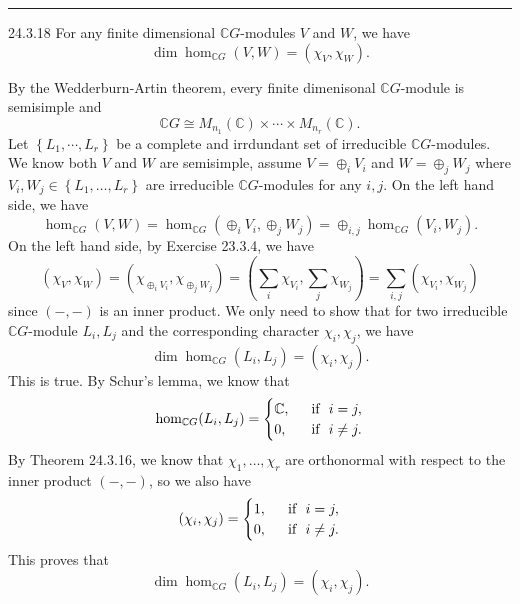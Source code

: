 \documentclass[a4paper, 12pt]{article}
\begin{document}
\noindent\rule{7in}{2.8pt}
\begin{problem}{24.3.18}
For any finite dimensional \(\mathbb{C}G\)-modules \(V\) and \(W\), we have 
\[\dim \hom_{\mathbb{C}G}(V,W)=(\chi_V,\chi_W).\]
\end{problem}
\begin{solution}
By the Wedderburn-Artin theorem, every finite dimenisonal \(\mathbb{C}G\)-module is semisimple and 
\[\mathbb{C}G\cong M_{n_1}(\mathbb{C})\times \cdots\times M_{n_r}(\mathbb{C}).\]
Let \(\left\{ L_1,\cdots,L_r \right\}\) be a complete and irrdundant set of irreducible \(\mathbb{C}G\)-modules. We know both \(V\) and \(W\) are semisimple, assume 
\(V=\oplus_i V_i\) and \(W=\oplus_j W_j\) where \(V_i,W_j\in \left\{ L_1,\ldots,L_r \right\}\) are irreducible \(\mathbb{C}G\)-modules for any \(i,j\). On the left hand side, we have 
\[\hom_{\mathbb{C}G}(V,W)=\hom_{\mathbb{C}G}(\oplus_i V_i,\oplus_j W_j)=\oplus_{i,j}\hom_{\mathbb{C}G}(V_i,W_j).\]
On the left hand side, by Exercise 23.3.4, we have 
\[(\chi_V,\chi_W)=(\chi_{\oplus_i V_i},\chi_{\oplus_j W_j})=(\sum_i \chi_{V_i},\sum_j \chi_{W_j})=\sum_{i,j}(\chi_{V_i},\chi_{W_j})\]
since \((-,-)\) is an inner product. We only need to show that for two irreducible \(\mathbb{C}G\)-module \(L_i,L_j\) and the corresponding character \(\chi_i,\chi_j\), we have 
\[\dim \hom_{\mathbb{C}G}(L_i,L_j)=(\chi_i,\chi_j).\]
This is true. By Schur's lemma, we know that 
\[\hom_{\mathbb{C}G}(L_i,L_j)=\begin{cases}
	\mathbb{C},&\ \ \text{if}\ \  i=j,\\ 
	0,&\ \ \text{if}\ \  i\neq j.
\end{cases}\] 
By Theorem 24.3.16, we know that \(\chi_1,\ldots,\chi_r\) are orthonormal with respect to the inner product \((-,-)\), so we also have 
\[(\chi_i,\chi_j)=\begin{cases}
	1,&\ \ \text{if}\ \  i=j,\\ 
	0,&\ \ \text{if}\ \  i\neq j.
\end{cases}\]
This proves that 
\[\dim \hom_{\mathbb{C}G}(L_i,L_j)=(\chi_i,\chi_j).\]
\end{solution}
\end{document}
